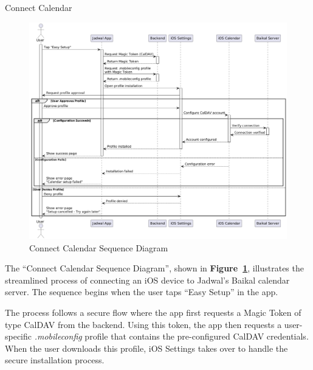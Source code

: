\begin{usecase}{Connect Calendar}
\end{usecase}

\begin{figure}[!h]
  \centering
  \includegraphics[width=\textwidth]{images/docs/diagrams/sequence-diagrams/all-sequence-diagrams/Connect Calendar.png}
  \caption{Connect Calendar Sequence Diagram}
  \label{fig:seq/connect-calendar}
\end{figure}

The ``Connect Calendar Sequence Diagram'', shown in \textbf{Figure~\ref{fig:seq/connect-calendar}}, illustrates the streamlined process of connecting an iOS device to Jadwal's Baikal calendar server. The sequence begins when the user taps ``Easy Setup'' in the app.

The process follows a secure flow where the app first requests a Magic Token of type CalDAV from the backend. Using this token, the app then requests a user-specific \textit{.mobileconfig} profile that contains the pre-configured CalDAV credentials. When the user downloads this profile, iOS Settings takes over to handle the secure installation process.

